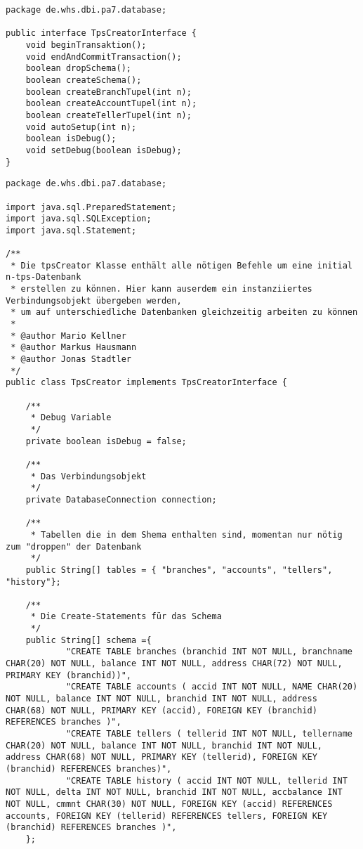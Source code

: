 \begin{lstlisting}[caption={TpsCreatorInterface}, label={lst:tpsiv2}]
package de.whs.dbi.pa7.database;

public interface TpsCreatorInterface {
	void beginTransaktion();
	void endAndCommitTransaction();
	boolean dropSchema();
	boolean createSchema();
	boolean createBranchTupel(int n);
	boolean createAccountTupel(int n);
	boolean createTellerTupel(int n);
	void autoSetup(int n);
	boolean isDebug();
	void setDebug(boolean isDebug);
}
\end{lstlisting}

\begin{lstlisting}[caption={TpsCreator}, label={lst:tpsv2}]
package de.whs.dbi.pa7.database;

import java.sql.PreparedStatement;
import java.sql.SQLException;
import java.sql.Statement;

/**
 * Die tpsCreator Klasse enthält alle nötigen Befehle um eine initial n-tps-Datenbank
 * erstellen zu können. Hier kann auserdem ein instanziiertes Verbindungsobjekt übergeben werden,
 * um auf unterschiedliche Datenbanken gleichzeitig arbeiten zu können
 * 
 * @author Mario Kellner
 * @author Markus Hausmann
 * @author Jonas Stadtler
 */
public class TpsCreator implements TpsCreatorInterface {
	
	/**
	 * Debug Variable
	 */
	private boolean isDebug = false;
	
	/**
	 * Das Verbindungsobjekt
	 */
	private DatabaseConnection connection;
	
	/**
	 * Tabellen die in dem Shema enthalten sind, momentan nur nötig zum "droppen" der Datenbank
	 */
	public String[] tables = { "branches", "accounts", "tellers", "history"};
	
	/**
	 * Die Create-Statements für das Schema
	 */
	public String[] schema ={
			"CREATE TABLE branches (branchid INT NOT NULL, branchname CHAR(20) NOT NULL, balance INT NOT NULL, address CHAR(72) NOT NULL, PRIMARY KEY (branchid))",
			"CREATE TABLE accounts ( accid INT NOT NULL, NAME CHAR(20) NOT NULL, balance INT NOT NULL, branchid INT NOT NULL, address CHAR(68) NOT NULL, PRIMARY KEY (accid), FOREIGN KEY (branchid) REFERENCES branches )",
			"CREATE TABLE tellers ( tellerid INT NOT NULL, tellername CHAR(20) NOT NULL, balance INT NOT NULL, branchid INT NOT NULL, address CHAR(68) NOT NULL, PRIMARY KEY (tellerid), FOREIGN KEY (branchid) REFERENCES branches)",
			"CREATE TABLE history ( accid INT NOT NULL, tellerid INT NOT NULL, delta INT NOT NULL, branchid INT NOT NULL, accbalance INT NOT NULL, cmmnt CHAR(30) NOT NULL, FOREIGN KEY (accid) REFERENCES accounts, FOREIGN KEY (tellerid) REFERENCES tellers, FOREIGN KEY (branchid) REFERENCES branches )",
	};
	

\end{lstlisting}
